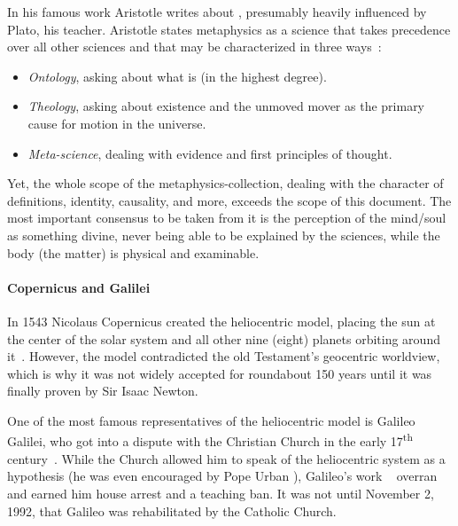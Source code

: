 In his famous work  Aristotle writes about , presumably heavily influenced by Plato, his teacher.
Aristotle states metaphysics as a science that takes precedence over all other sciences and that may be characterized in three ways~\cite{aristotle350}:
\begin{itemize}
    \item \emph{Ontology}, asking about what  is (in the highest degree).
    \item \emph{Theology}, asking about existence and the unmoved mover as the primary cause for motion in the universe.
    \item \emph{Meta-science}, dealing with evidence and first principles of thought.
\end{itemize}
Yet, the whole scope of the metaphysics-collection, dealing with the character of definitions, identity, causality, and more, exceeds the scope of this document.
The most important consensus to be taken from it is the perception of the \mbox{mind/soul} as something divine, never being able to be explained by the sciences,
while the body (the matter) is physical and examinable.


\paragraph{Copernicus and Galilei} In 1543 Nicolaus Copernicus created the heliocentric model, placing the sun at the center of the solar system and all other nine (eight) planets orbiting around it~\cite{copernicus1965revolutionibus}.
However, the model contradicted the old Testament's geocentric worldview, which is why it was not widely accepted for roundabout 150 years until it was finally proven by Sir Isaac Newton.

One of the most famous representatives of the heliocentric model is Galileo Galilei, who got into a dispute with the Christian Church in the early 17\textsuperscript{th} century~\cite{folsing1983galileo}.
While the Church allowed him to speak of the heliocentric system as a hypothesis (he was even encouraged by Pope Urban ), Galileo's work ~\cite{galilei1632dialogo} overran and earned him house arrest and a teaching ban.
It was not until November 2, 1992, that Galileo was rehabilitated by the Catholic Church.



